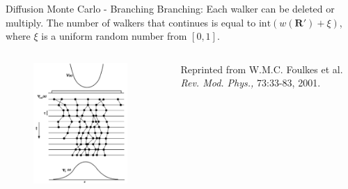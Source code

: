 \documentclass{beamer}
\newcommand{\R}{\mathbf{R}}
\begin{document}
\begin{frame}{Diffusion Monte Carlo - Branching}
Branching: Each walker can be deleted or multiply. The number of walkers that continues is equal to $\mathrm{int}\left(w(\R')+\xi\right)$, where $\xi$ is a uniform random number from $[0,1]$.
\begin{columns}
\begin{column}{0.4\textwidth}
\begin{figure}
   \includegraphics[width=0.9\textwidth]{branch_full.png}
\end{figure}
\end{column}
\begin{column}{0.7\textwidth}
   {\color{blue}{Figure:}} Reprinted from W.M.C. Foulkes et al. \textit{Rev. Mod. Phys.,} 73:33-83, 2001.
\end{column}
\end{columns}
\end{frame}
\end{document}
